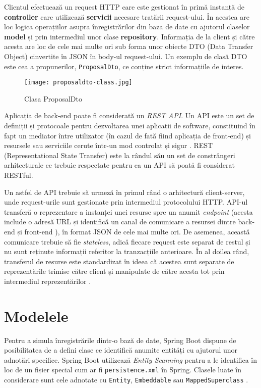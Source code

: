 Clientul efectuează un request HTTP care este gestionat în primă instanță de \textbf{controller} care utilizează \textbf{servicii} necesare tratării request-ului. În acestea are loc logica operațiilor asupra înregistrărilor din baza de date cu ajutorul claselor \textbf{model} și prin intermediul unor clase \textbf{repository}. Informația de la client și către acesta are loc de cele mai multe ori sub forma unor obiecte DTO (Data Transfer Object) cinvertite în JSON în body-ul request-ului. Un exemplu de clasă DTO este cea a propunerilor, \texttt{ProposalDto}, ce conține strict informațiile de interes.

\begin{figure}[H]
	\centering
	\texttt{[image: proposaldto-class.jpg]}
	\caption{Clasa ProposalDto}
\end{figure}

Aplicația de back-end poate fi considerată un \textit{REST API}. Un API este un set de definiții și protocoale pentru dezvoltarea unei aplicații de software, constituind în fapt un mediator între utilizator (în cazul de fată fiind aplicația de front-end) și resursele sau serviciile cerute într-un mod controlat și sigur \cite{rest-api}. REST (Representational State Transfer) este la rândul său un set de constrângeri arhitecturale ce trebuie respectate pentru ca un API să poată fi considerat RESTful.

Un astfel de API trebuie să urmeză în primul rând o arhitectură client-server, unde request-urile sunt gestionate prin intermediul protocolului HTTP. API-ul transferă o reprezentare a instanței unei resurse spre un anumit \textit{endpoint} (acesta include o adresă URL și identifică un canal de comunicare a resursei dintre back-end și front-end \cite{api-endpoint}), în format JSON de cele mai multe ori. De asemenea, această comunicare trebuie să fie \textit{stateless}, adică fiecare request este separat de restul și nu sunt reținute informații referitor la tranzacțiile anterioare. În al doilea rând, transferul de resurse este standardizat în ideea că acestea sunt separate de reprezentările trimise către client și manipulate de către acesta tot prin intermediul reprezentărilor \cite{rest-api}.

\section{Modelele}

Pentru a simula înregistrările dintr-o bază de date, Spring Boot dispune de posibilitatea de a defini clase ce identifică anumite entități cu ajutorul unor adnotări specifice. Spring Boot utilizează \textit{Entity Scanning} pentru a le identifica în loc de un fișier special cum ar fi \texttt{persistence.xml} în Spring. Clasele luate în considerare sunt cele adnotate cu \texttt{Entity}, \texttt{Embeddable} sau \texttt{MappedSuperclass} \cite{spring-boot-docs}.

